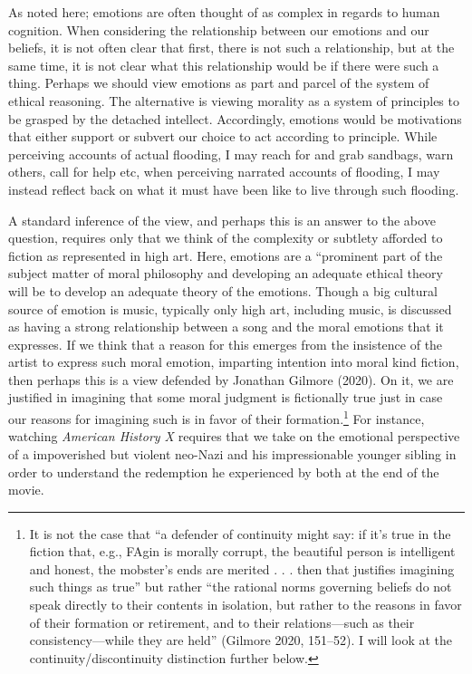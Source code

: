 \documentclass[12pt]{book}
\theoremstyle{definition}
\theoremstyle{remark}
\begin{document}
As noted here; emotions are often thought of as complex in regards to human cognition. When considering the relationship between our emotions and our beliefs, it is not often clear that first, there is not such a relationship, but at the same time, it is not clear what this relationship would be if there were such a thing. Perhaps we should view emotions as part and parcel of the system of ethical reasoning. The alternative is viewing morality as a system of principles to be grasped by the detached intellect. Accordingly, emotions would be motivations that either support or subvert our choice to act according to principle. While perceiving accounts of actual flooding, I may reach for and grab sandbags, warn others, call for help etc, when perceiving narrated accounts of flooding, I may instead reflect back on what it must have been like to live through such flooding.

A standard inference of the view, and perhaps this is an answer to the above question, requires only that we think of the complexity or subtlety afforded to fiction as represented in high art. Here, emotions are a ``prominent part of the subject matter of moral philosophy and developing an adequate ethical theory will be to develop an adequate theory of the emotions. Though a big cultural source of emotion is music, typically only high art, including music, is discussed as having a strong relationship between a song and the moral emotions that it expresses. If we think that a reason for this emerges from the insistence of the artist to express such moral emotion, imparting intention into moral kind fiction, then perhaps this is a view defended by Jonathan Gilmore (2020). On it, we are justified in imagining that some moral judgment is fictionally true just in case our reasons for imagining such is in favor of their formation.\footnote{It is not the case that ``a defender of continuity might say: if it's true in the fiction that, e.g., FAgin is morally corrupt, the beautiful person is intelligent and honest, the mobster's ends are merited . . . then that justifies imagining such things as true'' but rather ``the rational norms governing beliefs do not speak directly to their contents in isolation, but rather to the reasons in favor of their formation or retirement, and to their relations---such as their consistency---while they are held'' (Gilmore 2020, 151--52). I will look at the continuity/discontinuity distinction further below.} For instance, watching \emph{American History X} requires that we take on the emotional perspective of a impoverished but violent neo-Nazi and his impressionable younger sibling in order to understand the redemption he experienced by both at the end of the movie.
\end{document}
